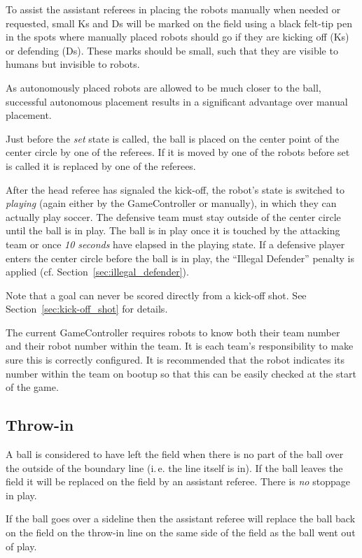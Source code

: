 \documentclass[12pt]{article}
\newcommand{\ie}{\mbox{i.\,e.}\xspace}
\newcommand{\cf}{\mbox{cf.}\xspace}
\begin{document}
To assist the assistant referees in placing the robots manually when needed or requested, small Ks and Ds will be marked on the field using a black felt-tip pen in the spots where manually placed robots should go if they are kicking off (Ks) or defending (Ds).  These marks should be small, such that they are visible to humans but invisible to robots.

As autonomously placed robots are allowed to be much closer to the ball, successful autonomous placement results in a significant advantage over manual placement.

Just before the \emph{set} state is called, the ball is placed on the center point of the center circle by one of the referees. If it is moved by one of the robots before set is called it is replaced by one of the referees.

After the head referee has signaled the kick-off, the robot's state is switched to \emph{playing} (again either by the GameController or manually), in which they can actually play soccer.
The defensive team must stay outside of the center circle until the ball is in play.  The ball is in play once it is touched by the attacking team or once \emph{10 seconds} have elapsed in the playing state. If a defensive player enters the center circle before the ball is in play, the ``Illegal Defender'' penalty is applied (\cf Section~\ref{sec:illegal_defender}).

Note that a goal can never be scored directly from a kick-off shot. See Section~\ref{sec:kick-off_shot} for details.

The current GameController requires robots to know both their team number and their robot number within the team. It is each team's responsibility to make sure this is correctly configured. It is recommended that the robot indicates its number within the team on bootup so that this can be easily checked at the start of the game.

\subsection{Throw-in}
\label{sec:throw_in}

A ball is considered to have left the field when there is no part of the ball over the outside of the boundary line (\ie the line itself is in). If the ball leaves the field it will be replaced on the field by an assistant referee. There is \emph{no} stoppage in play.

If the ball goes over a sideline then the assistant referee will replace the ball back on the field on the throw-in line on the same side of the field as the ball went out of play.
\end{document}
